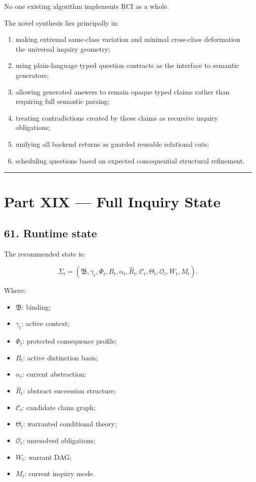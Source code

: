 \documentclass[
]{article}
\providecommand{\tightlist}{%
  \setlength{\itemsep}{0pt}\setlength{\parskip}{0pt}}
\begin{document}
No one existing algorithm implements RCI as a whole.

The novel synthesis lies principally in:

\begin{enumerate}
\def\labelenumi{\arabic{enumi}.}
\tightlist
\item
  making extremal same-class variation and minimal cross-class
  deformation the universal inquiry geometry;
\item
  using plain-language typed question contracts as the interface to
  semantic generators;
\item
  allowing generated answers to remain opaque typed claims rather than
  requiring full semantic parsing;
\item
  treating contradictions created by those claims as recursive inquiry
  obligations;
\item
  unifying all backend returns as guarded reusable relational cuts;
\item
  scheduling questions based on expected consequential structural
  refinement.
\end{enumerate}

\begin{center}\rule{0.5\linewidth}{0.5pt}\end{center}

\section{Part XIX --- Full Inquiry
State}\label{part-xix-full-inquiry-state}

\subsection{61. Runtime state}\label{runtime-state}

The recommended state is:

\[
\boxed{
\Sigma_t
=
(
\mathfrak B,
\gamma_t,
\Phi_t,
B_t,
\alpha_t,
\widehat R_t,
\mathcal C_t,
\Theta_t,
\mathcal O_t,
W_t,
M_t
).
}
\]

Where:

\begin{itemize}
\tightlist
\item
  \(\mathfrak B\): binding;
\item
  \(\gamma_t\): active context;
\item
  \(\Phi_t\): protected consequence profile;
\item
  \(B_t\): active distinction basis;
\item
  \(\alpha_t\): current abstraction;
\item
  \(\widehat R_t\): abstract succession structure;
\item
  \(\mathcal C_t\): candidate claim graph;
\item
  \(\Theta_t\): warranted conditional theory;
\item
  \(\mathcal O_t\): unresolved obligations;
\item
  \(W_t\): warrant DAG;
\item
  \(M_t\): current inquiry mode.
\end{itemize}
\end{document}
